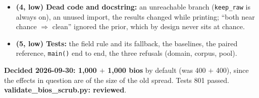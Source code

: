\documentclass{article}
\begin{document}
\begin{itemize}
        \texttt{--overwrite}; \texttt{meta} with the manifest's files and the parquet's SHA-256, both splits' bio
        ids; the shared overrides; any config but hiring's refused.
  \item \textbf{(4, low) Dead code and docstring:} an unreachable branch (\texttt{keep\_raw} is always on), an unused
        import, the results changed while printing; ``both near chance $\Rightarrow$ clean'' ignored the prior,
        which by design never sits at chance.
  \item \textbf{(5, low) Tests:} the field rule and its fallback, the baselines, the paired reference,
        \texttt{main()} end to end, the three refusals (domain, corpus, pool).
\end{itemize}
\textbf{Decided 2026-09-30: 1{,}000 $+$ 1{,}000 bios} by default (was 400 $+$ 400), since the effects in question are
of the size of the old spread. Tests 801 passed. \textbf{validate\_bios\_scrub.py: reviewed}.
\end{document}
